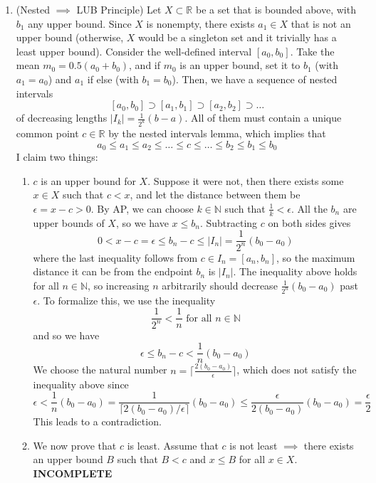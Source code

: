 \documentclass{article}
\begin{document}
\begin{solution}
\begin{enumerate}
        \item (Nested $\implies$ LUB Principle) Let $X \subset \mathbb{R}$ be a set that is bounded above, with $b_1$ any upper bound. Since $X$ is nonempty, there exists $a_1 \in X$ that is not an upper bound (otherwise, $X$ would be a singleton set and it trivially has a least upper bound). Consider the well-defined interval $[a_0, b_0]$. Take the mean $m_0 = 0.5 (a_0 + b_0)$, and if $m_0$ is an upper bound, set it to $b_1$ (with $a_1 = a_0$) and $a_1$ if else (with $b_1 = b_0$). Then, we have a sequence of nested intervals 
        \[[a_0, b_0] \supset [a_1, b_1] \supset [a_2, b_2] \supset \ldots \]
        of decreasing lengths $|I_k| = \frac{1}{2^{k}} (b - a)$. All of them must contain a unique common point $c \in \mathbb{R}$ by the nested intervals lemma, which implies that 
        \[a_0 \leq a_1 \leq a_2 \leq \ldots \leq c \leq \ldots \leq b_2 \leq b_1 \leq b_0\]
        I claim two things: 
        \begin{enumerate}
            \item $c$ is an upper bound for $X$. Suppose it were not, then there exists some $x \in X$ such that $c < x$, and let the distance between them be $\epsilon = x - c > 0$. By AP, we can choose $k \in \mathbb{N}$ such that $\frac{1}{k} < \epsilon$. All the $b_n$ are upper bounds of $X$, so we have $x \leq b_n$. Subtracting $c$ on both sides gives 
            \[0 < x - c = \epsilon \leq b_n - c \leq |I_n| = \frac{1}{2^n} (b_0 - a_0)\]
            where the last inequality follows from $c \in I_n = [a_n, b_n]$, so the maximum distance it can be from the endpoint $b_n$ is $|I_n|$. The inequality above holds for all $n \in \mathbb{N}$, so increasing $n$ arbitrarily should decrease $\frac{1}{2^n} (b_0 - a_0)$ past $\epsilon$. To formalize this, we use the inequality
            \[\frac{1}{2^n} < \frac{1}{n} \text{ for all } n \in \mathbb{N}\]
            and so we have 
            \[\epsilon \leq b_n - c < \frac{1}{n} (b_0 - a_0)\]
            We choose the natural number $n = \lceil \frac{2(b_0 - a_0)}{\epsilon} \rceil$, which does not satisfy the inequality above since 
            \[\epsilon < \frac{1}{n} (b_0 - a_0) = \frac{1}{\lceil 2(b_0 - a_0)/\epsilon \rceil} (b_0 - a_0) \leq \frac{\epsilon}{2(b_0 - a_0)} (b_0 - a_0) = \frac{\epsilon}{2}\]
            This leads to a contradiction. 
            \item We now prove that $c$ is least. Assume that $c$ is not least $\implies$ there exists an upper bound $B$ such that $B < c$ and $x \leq B$ for all $x \in X$. \textbf{INCOMPLETE}
        \end{enumerate}
    \end{enumerate}
    \end{solution}
\end{document}
